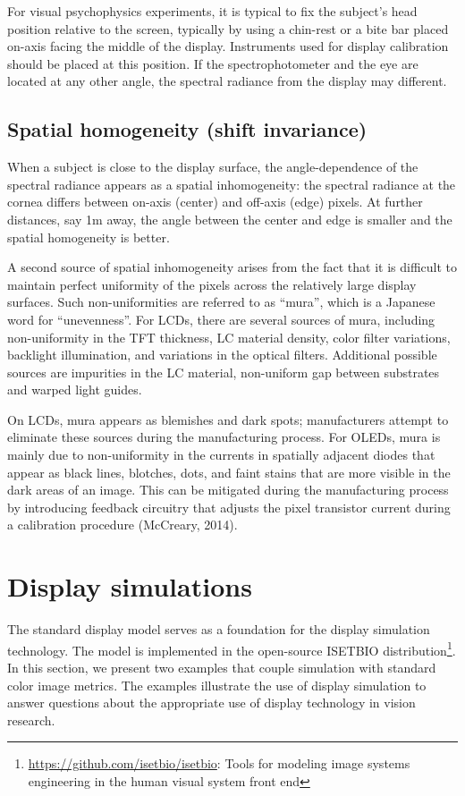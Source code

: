 \documentclass[
  letterpaper,
]{book}
\begin{document}
For visual psychophysics experiments, it is typical to fix the subject's
head position relative to the screen, typically by using a chin-rest or
a bite bar placed on-axis facing the middle of the display. Instruments
used for display calibration should be placed at this position. If the
spectrophotometer and the eye are located at any other angle, the
spectral radiance from the display may different.

\subsection{Spatial homogeneity (shift
invariance)}\label{spatial-homogeneity-shift-invariance}

When a subject is close to the display surface, the angle-dependence of
the spectral radiance appears as a spatial inhomogeneity: the spectral
radiance at the cornea differs between on-axis (center) and off-axis
(edge) pixels. At further distances, say 1m away, the angle between the
center and edge is smaller and the spatial homogeneity is better.

A second source of spatial inhomogeneity arises from the fact that it is
difficult to maintain perfect uniformity of the pixels across the
relatively large display surfaces. Such non-uniformities are referred to
as ``mura'', which is a Japanese word for ``unevenness''. For LCDs,
there are several sources of mura, including non-uniformity in the TFT
thickness, LC material density, color filter variations, backlight
illumination, and variations in the optical filters. Additional possible
sources are impurities in the LC material, non-uniform gap between
substrates and warped light guides.

On LCDs, mura appears as blemishes and dark spots; manufacturers attempt
to eliminate these sources during the manufacturing process. For OLEDs,
mura is mainly due to non-uniformity in the currents in spatially
adjacent diodes that appear as black lines, blotches, dots, and faint
stains that are more visible in the dark areas of an image. This can be
mitigated during the manufacturing process by introducing feedback
circuitry that adjusts the pixel transistor current during a calibration
procedure (McCreary, 2014).

\section{Display simulations}\label{display-simulations}

The standard display model serves as a foundation for the display
simulation technology. The model is implemented in the open-source
ISETBIO distribution\footnote{\url{https://github.com/isetbio/isetbio}:
  Tools for modeling image systems engineering in the human visual
  system front end}. In this section, we present two examples that
couple simulation with standard color image metrics. The examples
illustrate the use of display simulation to answer questions about the
appropriate use of display technology in vision research.
\end{document}
